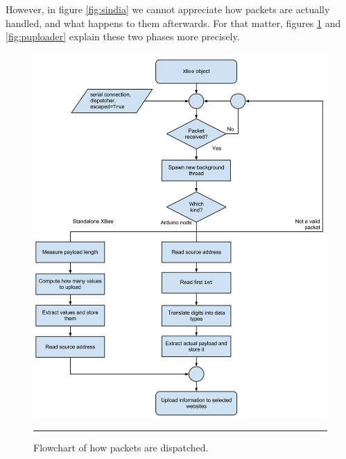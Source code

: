 However, in figure \ref{fig:sindia} we cannot appreciate how packets are actually handled, and what happens to them afterwards. For that matter, figures \ref{fig:phandler} and \ref{fig:puploader} explain these two phases more precisely.

\begin{figure}[htbp]
    \centering
        \includegraphics[scale=0.38]{./Figures/packet_handler.png}
        \rule{35em}{0.5pt}
    \caption[Packet dispatcher flowchart]{Flowchart of how packets are dispatched.}
    \label{fig:phandler}
\end{figure}

